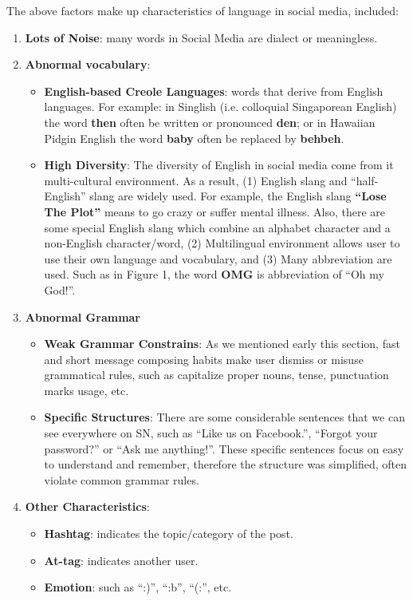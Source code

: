 \documentclass{llncs}
\begin{document}
The above factors make up characteristics of language in social media, included:

\begin{enumerate}
\item \textbf{Lots of Noise}: many words in Social Media are dialect or meaningless.
\item \textbf{Abnormal vocabulary}:
\begin{itemize}
\item \textbf{English-based Creole Languages}: words that derive from English languages. For example: in Singlish (i.e. colloquial Singaporean English) the word \textbf{then} often be written or pronounced \textbf{den}; or in Hawaiian Pidgin English the word \textbf{baby} often be replaced by \textbf{behbeh}.

\item \textbf{High Diversity}: The diversity of English in social media come from it multi-cultural environment. As a result, (1) English slang and “half-English” slang are widely used. For example, the English slang \textbf{“Lose The Plot”} means to go crazy or suffer mental illness. Also, there are some special English slang which combine an alphabet character and a non-English character/word, (2) Multilingual environment allows user to use their own language and vocabulary, and (3) Many abbreviation are used. Such as in Figure 1, the word \textbf{OMG} is abbreviation of “Oh my God!”.
\end{itemize}

\item \textbf{Abnormal Grammar}
\begin{itemize}
\item \textbf{Weak Grammar Constrains}: As we mentioned early this section, fast and short message composing habits make user dismiss or misuse grammatical rules, such as capitalize proper nouns, tense, punctuation marks usage, etc.

\item \textbf{Specific Structures}: There are some considerable sentences that we can see everywhere on SN, such as “Like us on Facebook.”, “Forgot your password?” or “Ask me anything!”. These specific sentences focus on easy to understand and remember, therefore the structure was simplified, often violate common grammar rules.

\end{itemize}

\item \textbf{Other Characteristics}:
\begin{itemize}
\item \textbf{Hashtag}: indicates the topic/category of the post.
\item \textbf{At-tag}: indicates another user.
\item \textbf{Emotion}: such as “:)”, “:b”, “(:”, etc.

\end{itemize}
\end{enumerate}
\end{document}
